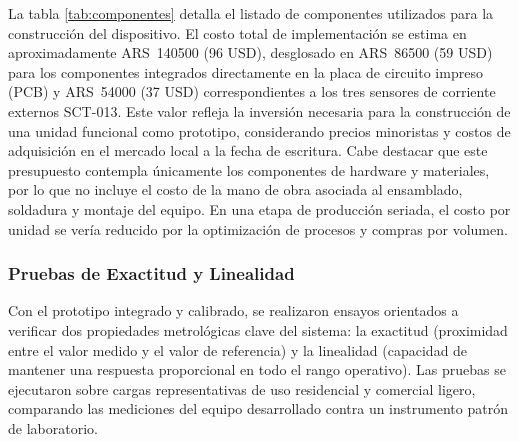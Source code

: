 \documentclass[12pt, a4paper]{article} %
\begin{document}
La tabla \ref{tab:componentes} detalla el listado de componentes utilizados para la construcción del dispositivo. El costo total de implementación se estima en aproximadamente ARS~\num{140500} (96 USD), desglosado en ARS~\num{86500} (59 USD) para los componentes integrados directamente en la placa de circuito impreso (PCB) y ARS~\num{54000} (37 USD) correspondientes a los tres sensores de corriente externos SCT-013. Este valor refleja la inversión necesaria para la construcción de una unidad funcional como prototipo, considerando precios minoristas y costos de adquisición en el mercado local a la fecha de escritura. Cabe destacar que este presupuesto contempla únicamente los componentes de hardware y materiales, por lo que no incluye el costo de la mano de obra asociada al ensamblado, soldadura y montaje del equipo. En una etapa de producción seriada, el costo por unidad se vería reducido por la optimización de procesos y compras por volumen.

\subsubsection{Pruebas de Exactitud y Linealidad}

Con el prototipo integrado y calibrado, se realizaron ensayos orientados a verificar dos propiedades metrológicas clave del sistema: la exactitud (proximidad entre el valor medido y el valor de referencia) y la linealidad (capacidad de mantener una respuesta proporcional en todo el rango operativo). Las pruebas se ejecutaron sobre cargas representativas de uso residencial y comercial ligero, comparando las mediciones del equipo desarrollado contra un instrumento patrón de laboratorio.
\end{document}
